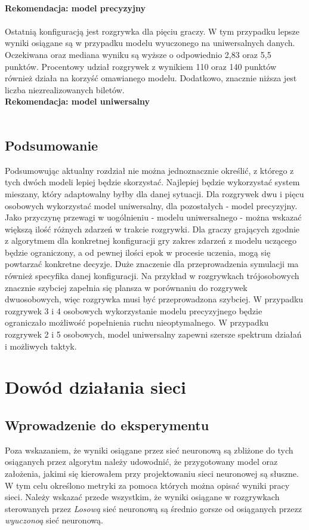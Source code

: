 \documentclass[12pt, oneside]{report}
\begin{document}
\\ \textbf{Rekomendacja: model precyzyjny} \\ \\ 
Ostatnią konfiguracją jest rozgrywka dla pięciu graczy. W tym przypadku lepsze wyniki osiągane są w przypadku modelu wyuczonego na uniwersalnych danych. Oczekiwana oraz mediana wyniku są wyższe o odpowiednio 2,83 oraz 5,5 punktów. Procentowy udział rozgrywek z wynikiem 110 oraz 140 punktów również działa na korzyść omawianego modelu. Dodatkowo, znacznie niższa jest liczba niezrealizowanych biletów. \\ \textbf{Rekomendacja: model uniwersalny} \\ \\
\section{Podsumowanie}
Podsumowując aktualny rozdział nie można jednoznacznie określić, z którego z tych dwóch modeli lepiej będzie skorzystać. Najlepiej będzie wykorzystać system mieszany, który adaptowalny byłby dla danej sytuacji. Dla rozgrywek dwu i pięcu osobowych wykorzystać model uniwersalny, dla pozostałych - model precyzyjny. Jako przyczynę przewagi w uogólnieniu - modelu uniwersalnego - można wskazać większą ilość różnych zdarzeń w trakcie rozgrywki. Dla graczy grających zgodnie z algorytmem dla konkretnej konfiguracji gry zakres zdarzeń z modelu uczącego będzie ograniczony, a od pewnej ilości epok w procesie uczenia, mogą się powtarzać konkretne decyzje. Duże znaczenie dla przeprowadzenia symulacji ma również specyfika danej konfiguracji. Na przykład w rozgrywkach trójosobowych znacznie szybciej zapełnia się plansza w porównaniu do rozgrywek dwuosobowych, więc rozgrywka musi być przeprowadzona szybciej. W przypadku rozgrywek 3 i 4 osobowych wykorzystanie modelu precyzyjnego będzie ograniczało możliwość popełnienia ruchu nieoptymalnego. W przypadku rozgrywek 2 i 5 osobowych, model uniwersalny zapewni szersze spektrum działań i możliwych taktyk.
\chapter{Dowód działania sieci}
\section{Wprowadzenie do eksperymentu}
Poza wskazaniem, że wyniki osiągane przez sieć neuronową są zbliżone do tych osiąganych przez algorytm należy udowodnić, że przygotowany model oraz założenia, jakimi się kierowałem przy projektowaniu sieci neuronowej są słuszne. W tym celu określono metryki za pomoca których można opisać wyniki pracy sieci. Należy wskazać przede wszystkim, że wyniki osiągane w rozgrywkach sterowanych przez \textit{Losową} sieć neuronową są średnio gorsze od osiąganych przezz \textit{wyuczonoą} sieć neuronową.
\end{document}

